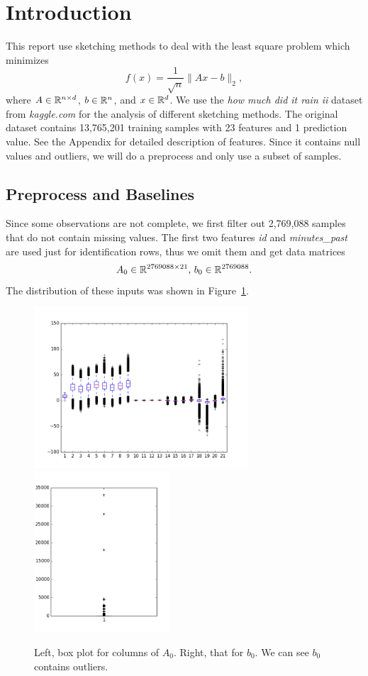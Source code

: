 \section{Introduction}
\label{sec:intro}

This report use sketching methods to deal with the
least square problem which minimizes
\begin{equation} \label{eq:ls}
    f(x) = \frac{1}{\sqrt{n}} \|Ax-b\|_2,
\end{equation}
where $A\in{\mathbb{R}}^{n\times d}$, $b\in{\mathbb{R}}^n$, and $x\in{\mathbb{R}}^d$.
We use the \emph{how much did it rain ii} \cite{rain, Lakshmanan16}
dataset from \emph{kaggle.com} for the analysis of different sketching methods.
The original dataset contains 13,765,201 training samples
with 23 features and 1 prediction value.
See the Appendix for detailed description of features.
Since it contains null values and outliers,
we will do a preprocess and only use a subset of samples.

\subsection{Preprocess and Baselines}

Since some observations are not complete,
we first filter out 2,769,088 samples that do not contain missing values.
The first two features \emph{id} and \emph{minutes\_past}
are used just for identification rows,
thus we omit them and
get data matrices
\begin{equation}
    A_0 \in {\mathbb{R}}^{2769088\times 21}, \,
    b_0\in{\mathbb{R}}^{2769088}.
\end{equation}
The distribution of these inputs was shown in Figure~\ref{fig:box}.
\begin{figure}[htb]
	\centering
	\includegraphics[height=6cm]{fig/box_a_0.png}
	\includegraphics[height=6cm]{fig/box_b_0.png}
	\caption{\small
		Left, box plot for columns of $A_0$.
        Right, that for $b_0$.
        We can see $b_0$ contains outliers.}
	\label{fig:box}
\end{figure}

